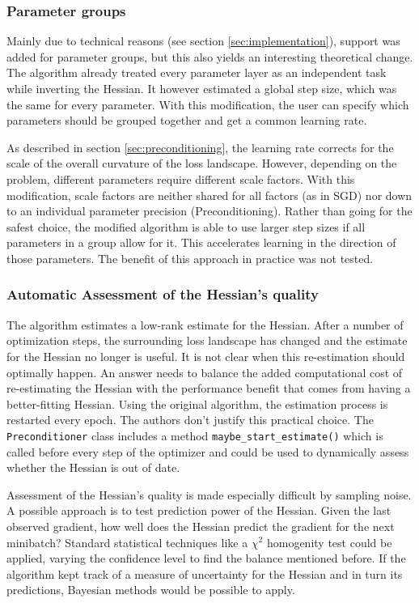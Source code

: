 \documentclass[twoside,12pt,a4paper]{report}
\begin{document}
\subsubsection{Parameter groups}
Mainly due to technical reasons (see section \ref{sec:implementation}), support was added for parameter groups, but this also yields an interesting theoretical change. The algorithm already treated every parameter layer as an independent task while inverting the Hessian. It however estimated a global step size, which was the same for every parameter. With this modification, the user can specify which parameters should be grouped together and get a common learning rate.

As described in section \ref{sec:preconditioning}, the learning rate corrects for the scale of the overall curvature of the loss landscape. However, depending on the problem, different parameters require different scale factors. With this modification, scale factors are neither shared for all factors (as in SGD) nor down to an individual parameter precision (Preconditioning).
Rather than going for the safest choice, the modified algorithm is able to use larger step sizes if all parameters in a group allow for it. This accelerates learning in the direction of those parameters. The benefit of this approach in practice was not tested.

\subsubsection{Automatic Assessment of the Hessian's quality}
The algorithm estimates a low-rank estimate for the Hessian. After a number of optimization steps, the surrounding loss landscape has changed and the estimate for the Hessian no longer is useful.
It is not clear when this re-estimation should optimally happen. An answer needs to balance the added computational cost of re-estimating the Hessian with the performance benefit that comes from having a better-fitting Hessian.
Using the original algorithm, the estimation process is restarted every epoch. The authors don't justify this practical choice.
The \verb|Preconditioner| class includes a method \verb|maybe_start_estimate()| which is called before every step of the optimizer and could be used to dynamically assess whether the Hessian is out of date.

Assessment of the Hessian's quality is made especially difficult by sampling noise. A possible approach is to test prediction power of the Hessian. Given the last observed gradient, how well does the Hessian predict the gradient for the next minibatch? Standard statistical techniques like a $\chi^2$ homogenity test could be applied, varying the confidence level to find the balance mentioned before.
If the algorithm kept track of a measure of uncertainty for the Hessian and in turn its predictions, Bayesian methods would be possible to apply.
\end{document}
